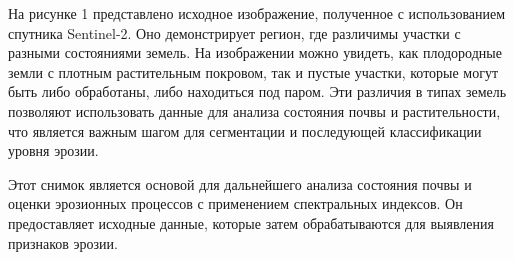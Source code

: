 \begin{multicols}{2}
На рисунке 1 представлено исходное изображение, полученное с
использованием спутника Sentinel-2. Оно демонстрирует регион, где
различимы участки с разными состояниями земель. На изображении можно
увидеть, как плодородные земли с плотным растительным покровом, так и
пустые участки, которые могут быть либо обработаны, либо находиться под
паром. Эти различия в типах земель позволяют использовать данные для
анализа состояния почвы и растительности, что является важным шагом для
сегментации и последующей классификации уровня эрозии.

Этот снимок является основой для дальнейшего анализа состояния почвы и
оценки эрозионных процессов с применением спектральных индексов. Он
предоставляет исходные данные, которые затем обрабатываются для
выявления признаков эрозии.
\end{multicols}

